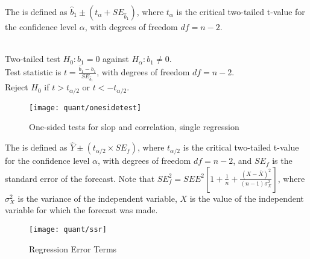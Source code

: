 \begin{definition} The  is defined as $\hat{b}_1 \pm (t_{\alpha} + SE_{\hat{b}_1})$, where $t_{\alpha}$ is the critical two-tailed t-value for the confidence level $\alpha$, with degrees of freedom $df = n-2$.
\end{definition}

\begin{definition} \\
Two-tailed test $H_0: b_1 = 0$ against $H_{\alpha} : b_1 \neq 0$.\\
Test statistic is $t = \frac{\hat{b}_1 - b_1}{SE_{\hat{b}_1}}$, with degrees of freedom $df = n-2$.\\
Reject $H_0$ if $t > t_{\alpha/2}$ or $t < - t_{\alpha/2}$.
\end{definition}

\begin{figure}[H]
\centering
\texttt{[image: quant/onesidetest]}
\caption{One-sided tests for slop and correlation, single regression}
\end{figure}

\begin{definition} The  is defined as $\hat{Y} \pm (t_{\alpha/2} \times SE_{f})$, where $t_{\alpha/2}$ is the critical two-tailed t-value for the confidence level $\alpha$, with degrees of freedom $df = n-2$, and $SE_f$ is the standard error of the forecast. 
 Note that $SE_f^2 = SEE^2 \left[1 + \frac{1}{n} + \frac{(X - \overline{X})^2}{(n-1)\sigma^2_X} \right]$, where $\sigma^2_X$ is the variance of the independent variable, $X$ is the value of the independent variable for which the forecast was made.
\end{definition}

\begin{figure}[H]
\centering
\texttt{[image: quant/ssr]}
\caption{Regression Error Terms}
\end{figure}
 
